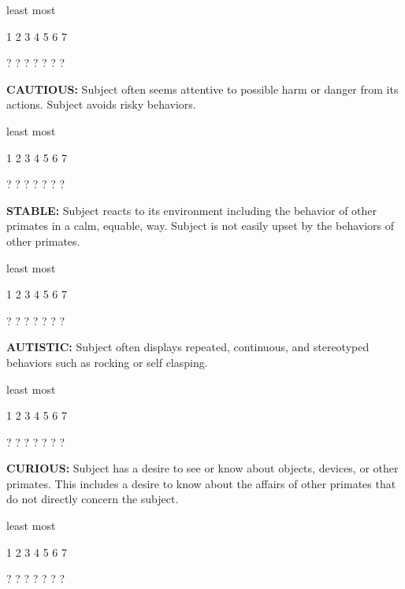 \documentclass{article} %
\begin{document}
\noindent  

\noindent least                            most

  1    2    3    4    5    6    7   

  ?    ?    ?    ?    ?    ?    ?   

\noindent \textbf{ }

\noindent \textbf{CAUTIOUS:} Subject often seems attentive to possible harm or danger from its actions. Subject avoids risky behaviors. 

\noindent  

\noindent least                            most

  1    2    3    4    5    6    7   

  ?    ?    ?    ?    ?    ?    ?   

\noindent  

\noindent \textbf{STABLE:} Subject reacts to its environment including the behavior of other primates in a calm, equable, way. Subject is not easily upset by the behaviors of other primates. 

\noindent  

\noindent least                            most

  1    2    3    4    5    6    7   

  ?    ?    ?    ?    ?    ?    ?   

\noindent \textbf{ }

\noindent \textbf{AUTISTIC:} Subject often displays repeated, continuous, and stereotyped behaviors such as rocking or self clasping. 

\noindent  

\noindent least                            most

  1    2    3    4    5    6    7   

  ?    ?    ?    ?    ?    ?    ?   

\noindent  

\noindent \textbf{CURIOUS:} Subject has a desire to see or know about objects, devices, or other primates. This includes a desire to know about the affairs of other primates that do not directly concern the subject. 

\noindent  

\noindent least                            most

  1    2    3    4    5    6    7   

  ?    ?    ?    ?    ?    ?    ?   

\noindent \textbf{ }
\end{document}
